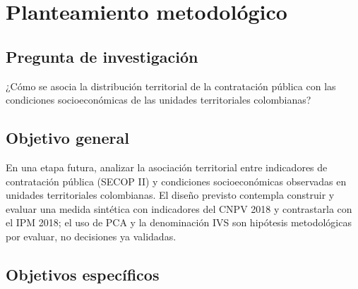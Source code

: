 \section{Planteamiento metodológico}
\label{ch:metodologia}

\subsection{Pregunta de investigación}
\label{sec:pregunta_investigacion}

¿Cómo se asocia la distribución territorial de la contratación pública con las condiciones socioeconómicas de las unidades territoriales colombianas?

\subsection{Objetivo general}
\label{sec:objetivo_general}

En una etapa futura, analizar la asociación territorial entre indicadores de contratación pública (SECOP II) y condiciones socioeconómicas observadas en unidades territoriales colombianas. El diseño previsto contempla construir y evaluar una medida sintética con indicadores del CNPV 2018 y contrastarla con el IPM 2018; el uso de PCA y la denominación IVS son hipótesis metodológicas por evaluar, no decisiones ya validadas.

\subsection{Objetivos específicos}
\label{sec:objetivos_especificos}

